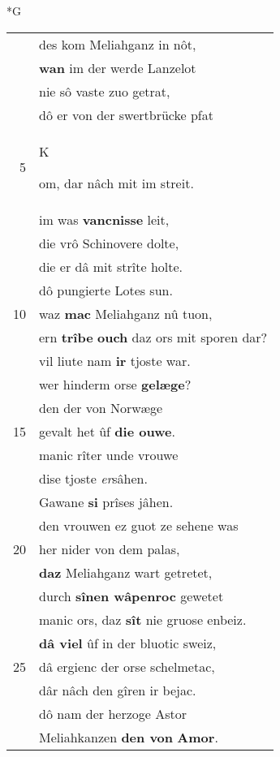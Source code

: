 \documentclass[8pt,a4paper,notitlepage]{article}
\begin{document}
\newpage
\begin{table}[ht]
\begin{minipage}[t]{0.5\linewidth}
\small
\begin{center}*G
\end{center}
\begin{tabular}{rl}
 & des kom Meliahganz in nôt,\\ 
 & \textbf{wan} im der werde Lanzelot\\ 
 & nie sô vaste zuo getrat,\\ 
 & dô er von der swertbrücke pfat\\ 
5 & \begin{large}K\end{large}om, dar nâch mit im streit.\\ 
 & im was \textbf{vancnisse} leit,\\ 
 & die vrô Schinovere dolte,\\ 
 & die er dâ mit strîte holte.\\ 
 & dô pungierte Lotes sun.\\ 
10 & waz \textbf{mac} Meliahganz nû tuon,\\ 
 & ern \textbf{trîbe} \textbf{ouch} daz ors mit sporen dar?\\ 
 & vil liute nam \textbf{ir} tjoste war.\\ 
 & wer hinderm orse \textbf{gelæge}?\\ 
 & den der von Norwæge\\ 
15 & gevalt het ûf \textbf{die ouwe}.\\ 
 & manic rîter unde vrouwe\\ 
 & dise tjoste \textit{er}sâhen.\\ 
 & Gawane \textbf{si} prîses jâhen.\\ 
 & den vrouwen ez guot ze sehene was\\ 
20 & her nider von dem palas,\\ 
 & \textbf{daz} Meliahganz wart getretet,\\ 
 & durch \textbf{sînen wâpenroc} gewetet\\ 
 & manic ors, daz \textbf{sît} nie gruose enbeiz.\\ 
 & \textbf{dâ viel} ûf in der bluotic sweiz,\\ 
25 & dâ ergienc der orse schelmetac,\\ 
 & dâr nâch den gîren ir bejac.\\ 
 & dô nam der herzoge Astor\\ 
 & Meliahkanzen \textbf{den von} \textbf{Amor}.\\ 

\end{tabular}
\end{minipage}
\end{table}
\end{document}
